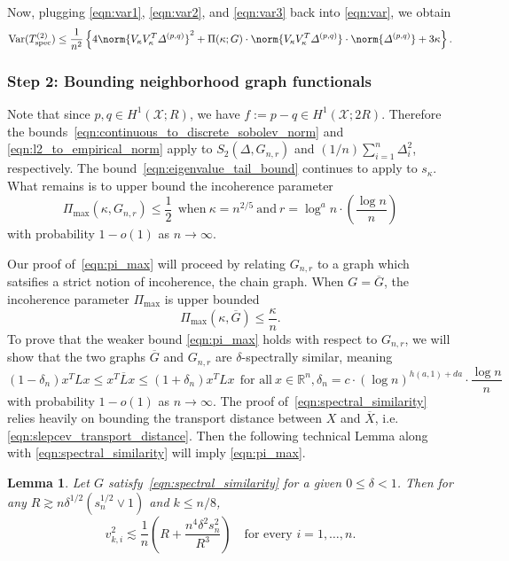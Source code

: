 \documentclass{article}
\newcommand{\Reals}{\mathbb{R}}
\newcommand{\Var}{\mathrm{Var}}
\newcommand{\1}{\mathbf{1}}
\newcommand{\vardeltapq}{\varDelta^{(p,q)}}
\newcommand{\spec}{\mathrm{spec}}
\theoremstyle{alden}
\theoremstyle{aldenthm}
\newtheorem{lemma}{Lemma}
\theoremstyle{definition}
\theoremstyle{remark}
\begin{document}
Now, plugging \eqref{eqn:var1}, \eqref{eqn:var2}, and \eqref{eqn:var3} back into \eqref{eqn:var}, we obtain
\begin{equation}
\label{eqn:var_5}
\Var(T_{\spec}^{(2)}) \leq \frac{1}{n^2}\left\{4\norm{V_{\kappa}V_{\kappa}^T \vardeltapq}^2 + \Pi(\kappa;G) \cdot \norm{V_{\kappa}V_{\kappa}^T \vardeltapq} \cdot \norm{\vardeltapq} + 3\kappa \right\}.
\end{equation}


\subsubsection{Step 2: Bounding neighborhood graph functionals}

Note that since $p,q \in H^1(\mathcal{X};R)$, we have $f := p - q \in H^1(\mathcal{X};2R)$. Therefore the bounds~\eqref{eqn:continuous_to_discrete_sobolev_norm} and \eqref{eqn:l2_to_empirical_norm} apply to $S_2(\varDelta,G_{n,r})$ and $(1/n)\sum_{i = 1}^{n}\varDelta_i^2$, respectively. The bound~\eqref{eqn:eigenvalue_tail_bound} continues to apply to $s_{\kappa}$. What remains is to upper bound the incoherence parameter
\begin{equation}
\label{eqn:pi_max}
\Pi_{\max}(\kappa,G_{n,r}) \leq \frac{1}{2}~~\textrm{when}~ \kappa = n^{2/5}~\textrm{and}~ r = \log^a n \cdot \left(\frac{\log n}{n}\right)
\end{equation}
with probability $1 - o(1)$ as $n \to \infty$.

Our proof of~\eqref{eqn:pi_max} will proceed by relating $G_{n,r}$ to a graph which satsifies a strict notion of incoherence, the chain graph. When $G = \overline{G}$, the incoherence parameter $\Pi_{\max}$ is upper bounded
\begin{equation}
\Pi_{\max}(\kappa,\overline{G}) \leq \frac{\kappa}{n}.
\end{equation}
To prove that the weaker bound \eqref{eqn:pi_max} holds with respect to $G_{n,r}$, we will show that the two graphs $\overline{G}$ and $G_{n,r}$ are $\delta$-spectrally similar, meaning
\begin{equation}
\label{eqn:spectral_similarity}
(1 - \delta_n) x^T L x \leq x^T \overline{L} x \leq (1 + \delta_n) x^T L x~~\textrm{for all}~x \in \Reals^n, \delta_n = c \cdot (\log n)^{h(a,1) + da}\cdot \frac{\log n}{n}
\end{equation}
with probability $1 - o(1)$ as $n \to \infty$. The proof of~\eqref{eqn:spectral_similarity} relies heavily on bounding the transport distance between $X$ and $\overline{X}$, i.e. \eqref{eqn:slepcev_transport_distance}. Then the following technical Lemma along with \eqref{eqn:spectral_similarity} will imply \eqref{eqn:pi_max}.
\begin{lemma}
	\label{lem:pi_max_pf_1}
	Let $G$ satisfy~\eqref{eqn:spectral_similarity} for a given $0 \leq \delta < 1$. Then for any $R \gtrsim n \delta^{1/2} (s_{n}^{1/2} \vee 1)$ and $k \leq n/8$,
	\begin{equation*}
	v_{k,i}^2 \lesssim \frac{1}{n}\left(R + \frac{n^4 \delta^2 s_{n}^2}{R^3}\right) \quad \textrm{for every $i = 1,\ldots,n$.}
	\end{equation*} 
\end{lemma}
\end{document}
